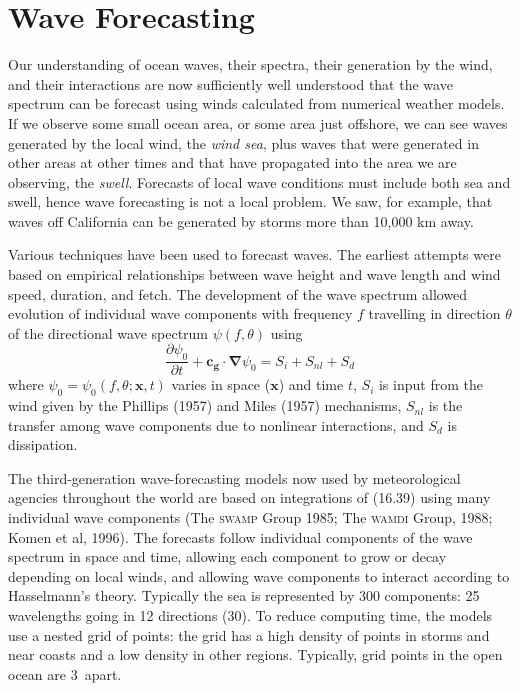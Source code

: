 \section{Wave Forecasting}
Our understanding of ocean waves, their spectra, their generation by
the wind, and their interactions are now sufficiently well understood that the wave spectrum
can be forecast using winds calculated from numerical weather models. If we observe some small
ocean area, or some area just offshore, we can see waves generated by the local wind, the
\textit{wind sea}, plus waves that were generated in other areas at
other times and that have propagated into the area we are observing, the \textit{swell}.
Forecasts of local wave conditions must include both sea and swell, hence wave forecasting is
not a local problem. We saw, for example, that waves off California can be generated by storms
more than 10,000 km away.

Various techniques have been used to forecast waves. The earliest attempts were
based on empirical relationships between wave height and wave length and wind
speed, duration, and fetch. The development of the wave spectrum allowed evolution
of individual wave components with frequency $f$ travelling in direction $\theta $
of the directional wave spectrum
$\psi (f, \theta )$ using
\begin{equation}
\frac{\partial \psi_0 }{\partial t} + \mathbf{c_g \cdot \nabla }\psi_0 = S_{i}
+ S_{nl} + S_{d}
\end{equation}
where $\psi_0 = \psi _0 (f, \theta ; \mathbf{x},t)$ varies in space
($\mathbf x$) and time $t$, $S_{i}$ is input from the wind given by the
Phillips (1957) and Miles (1957) mechanisms, $S_{nl}$ is the transfer among wave
components due to nonlinear interactions, and $S_{d}$ is dissipation.

The third-generation wave-forecasting models now used by meteorological agencies throughout the world are based on integrations of (16.39) using many individual wave components (The \textsc{swamp} Group 1985; The \textsc{wamdi} Group, 1988; Komen et al, 1996). The forecasts follow  individual components of the wave spectrum in space and time, allowing each component to grow or decay depending on local winds, and allowing wave components to interact according to Hasselmann's theory. Typically the sea is represented by 300 components: 25 wavelengths going in 12 directions (30\degrees ). To reduce computing time, the models use a nested grid of points: the grid has a high density of points in storms and near coasts and a low density in other regions. Typically, grid points in the open ocean are
3\degrees\ apart.

